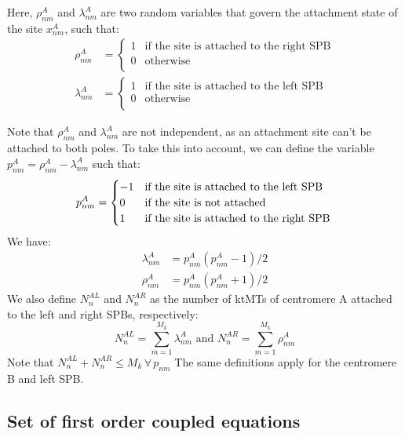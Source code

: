\documentclass[a4paper,12pt]{article}
\begin{document}
Here, $\rho_{nm}^A$ and $\lambda_{nm}^A$ are two random variables that govern
the attachment state of the site $x_{nm}^A$, such that:
\begin{align}
  \label{eq:rholambda}
  \rho_{nm}^A &= 
  \begin{cases}
    1 &\text{if the site is attached to the right SPB}\\
    0 &\text{otherwise}\\
  \end{cases}\\
  \lambda_{nm}^A &=
  \begin{cases}
    1 &\text{if the site is attached to the left SPB}\\
    0 &\text{otherwise}\\
  \end{cases}
\end{align}

Note that $\rho_{nm}^A$ and $\lambda_{nm}^A$ are not independent, as
an attachment site can't be attached to both poles. To take this into
account, we can define the variable $p_{nm}^A = \rho_{nm}^A -
\lambda_{nm}^A$ such that:
\begin{equation}
  \label{eq:rholambda}
  p_{nm}^A = 
  \begin{cases}
    - 1 &\text{if the site is attached to the left SPB}\\
    0 &\text{if the site is not attached}\\
    1 &\text{if the site is attached to the right SPB}\\
  \end{cases}\\
\end{equation}
We have:
\begin{align}
  \lambda_{nm}^A &= p_{nm}^A\left(p_{nm}^A - 1\right)/2\\
  \rho_{nm}^A &= p_{nm}^A\left(p_{nm}^A + 1\right)/2
\end{align}
We also define $N_n^{AL}$ and $N_n^{AR}$ as the number of ktMTs of
centromere A attached to the left and right SPBs, respectively:
\begin{equation}
  \label{eq:NAL}
  N_n^{AL} = \sum_{m = 1}^{M_k}\lambda_{nm}^A \mbox{ and }%
  N_n^{AR} = \sum_{m = 1}^{M_k}\rho_{nm}^A 
\end{equation}
Note that $N_n^{AL} + N_n^{AR} \leq M_k\, \forall\, p_{nm} $
The same definitions apply for the centromere B and left SPB.

\subsection{Set of first order coupled equations}
\end{document}
